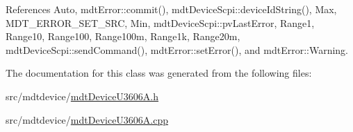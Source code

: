 References Auto, mdt\-Error\-::commit(), mdt\-Device\-Scpi\-::device\-Id\-String(), Max, M\-D\-T\-\_\-\-E\-R\-R\-O\-R\-\_\-\-S\-E\-T\-\_\-\-S\-R\-C, Min, mdt\-Device\-Scpi\-::pv\-Last\-Error, Range1, Range10, Range100, Range100m, Range1k, Range20m, mdt\-Device\-Scpi\-::send\-Command(), mdt\-Error\-::set\-Error(), and mdt\-Error\-::\-Warning.



The documentation for this class was generated from the following files\-:\begin{DoxyCompactItemize}
\item 
src/mdtdevice/\hyperlink{mdt_device_u3606_a_8h}{mdt\-Device\-U3606\-A.\-h}\item 
src/mdtdevice/\hyperlink{mdt_device_u3606_a_8cpp}{mdt\-Device\-U3606\-A.\-cpp}\end{DoxyCompactItemize}
